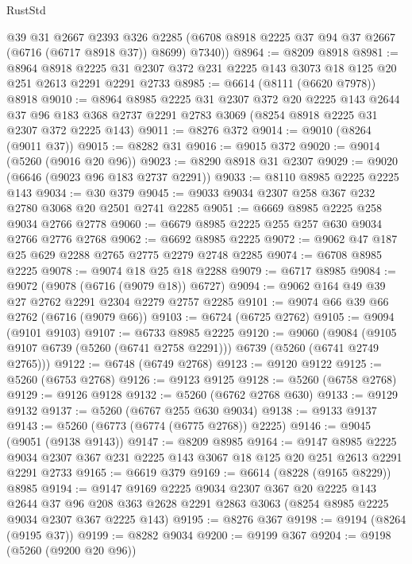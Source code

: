 \begin{lexlean}{RustStd}
\begin{coremodule}
        @39
        @31
        @2667
        @2393
        @326
        @2285
        (@6708 @8918 @2225 @37 @94 @37 @2667 (@6716 (@6717 @8918 @37)) @8699)
        @7340))
@8964 := @8209 @8918
@8981 := @8964
    @8918
    @2225
    @31
    @2307
    @372
    @231
    @2225
    @143
    @3073
    @18
    @125
    @20
    @251
    @2613
    @2291
    @2291
    @2733
@8985 := @6614 (@8111 (@6620 @7978)) @8918
@9010 := @8964
    @8985
    @2225
    @31
    @2307
    @372
    @20
    @2225
    @143
    @2644
    @37
    @96
    @183
    @368
    @2737
    @2291
    @2783
    @3069
    (@8254 @8918 @2225 @31 @2307 @372 @2225 @143)
@9011 := @8276 @372
@9014 := @9010 (@8264 (@9011 @37))
@9015 := @8282 @31
@9016 := @9015 @372
@9020 := @9014 (@5260 (@9016 @20 @96))
@9023 := @8290 @8918 @31 @2307
@9029 := @9020 (@6646 (@9023 @96 @183 @2737 @2291))
@9033 := @8110 @8985 @2225 @2225 @143
@9034 := @30 @379
@9045 := @9033 @9034 @2307 @258 @367 @232 @2780 @3068 @20 @2501 @2741 @2285
@9051 := @6669 @8985 @2225 @258 @9034 @2766 @2778
@9060 := @6679 @8985 @2225 @255 @257 @630 @9034 @2766 @2776 @2768
@9062 := @6692 @8985 @2225
@9072 := @9062 @47 @187 @25 @629 @2288 @2765 @2775 @2279 @2748 @2285
@9074 := @6708 @8985 @2225
@9078 := @9074 @18 @25 @18 @2288
@9079 := @6717 @8985
@9084 := @9072 (@9078 (@6716 (@9079 @18)) @6727)
@9094 := @9062 @164 @49 @39 @27 @2762 @2291 @2304 @2279 @2757 @2285
@9101 := @9074 @66 @39 @66 @2762 (@6716 (@9079 @66))
@9103 := @6724 (@6725 @2762)
@9105 := @9094 (@9101 @9103)
@9107 := @6733 @8985 @2225
@9120 := @9060
    (@9084 (@9105 @9107 @6739 (@5260 (@6741 @2758 @2291))) @6739 (@5260 (@6741 @2749 @2765)))
@9122 := @6748 (@6749 @2768)
@9123 := @9120 @9122
@9125 := @5260 (@6753 @2768)
@9126 := @9123 @9125
@9128 := @5260 (@6758 @2768)
@9129 := @9126 @9128
@9132 := @5260 (@6762 @2768 @630)
@9133 := @9129 @9132
@9137 := @5260 (@6767 @255 @630 @9034)
@9138 := @9133 @9137
@9143 := @5260 (@6773 (@6774 (@6775 @2768)) @2225)
@9146 := @9045 (@9051 (@9138 @9143))
@9147 := @8209 @8985
@9164 := @9147
    @8985
    @2225
    @9034
    @2307
    @367
    @231
    @2225
    @143
    @3067
    @18
    @125
    @20
    @251
    @2613
    @2291
    @2291
    @2733
@9165 := @6619 @379
@9169 := @6614 (@8228 (@9165 @8229)) @8985
@9194 := @9147
    @9169
    @2225
    @9034
    @2307
    @367
    @20
    @2225
    @143
    @2644
    @37
    @96
    @208
    @363
    @2628
    @2291
    @2863
    @3063
    (@8254 @8985 @2225 @9034 @2307 @367 @2225 @143)
@9195 := @8276 @367
@9198 := @9194 (@8264 (@9195 @37))
@9199 := @8282 @9034
@9200 := @9199 @367
@9204 := @9198 (@5260 (@9200 @20 @96))

\end{coremodule}
\end{lexlean}
